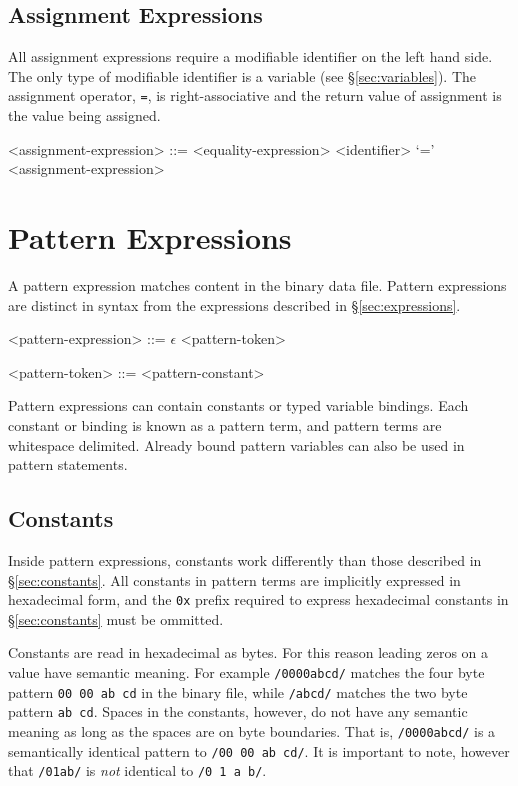 \documentclass[letterpaper]{article}
\begin{document}

\subsection{Assignment Expressions}
\label{sec:assignment}
All assignment expressions require a modifiable identifier on the left hand side.  The only type of modifiable identifier is a variable (see \S\ref{sec:variables}).  The assignment operator, \texttt{=}, is right-associative and the return value of assignment is the value being assigned.
\begin{grammar}
<assignment-expression> ::= <equality-expression>
\alt <identifier> `=' <assignment-expression>
\end{grammar}


\section{Pattern Expressions}
\label{sec:pattern-expressions}
A pattern expression matches content in the binary data file.  Pattern expressions are distinct in syntax from the expressions described in \S\ref{sec:expressions}.

\begin{grammar}
<pattern-expression> ::= $\epsilon$
 <pattern-token>

<pattern-token> ::= <pattern-constant>
\end{grammar}

Pattern expressions can contain constants or typed variable bindings.  Each constant or binding is known as a pattern term, and pattern terms are whitespace delimited.  Already bound pattern variables can also be used in pattern statements.

\subsection{Constants}
\label{sec:pattern-constants}
Inside pattern expressions, constants work differently than those described in \S\ref{sec:constants}.  All constants in pattern terms are implicitly expressed in hexadecimal form, and the \texttt{0x} prefix required to express hexadecimal constants in \S\ref{sec:constants} must be ommitted.

Constants are read in hexadecimal as bytes.  For this reason leading zeros on a value have semantic meaning.  For example \texttt{/0000abcd/} matches the four byte pattern \texttt{00 00 ab cd} in the binary file, while \texttt{/abcd/} matches the two byte pattern \texttt{ab cd}.  Spaces in the constants, however, do not have any semantic meaning as long as the spaces are on byte boundaries.  That is, \texttt{/0000abcd/} is a semantically identical pattern to \texttt{/00 00 ab cd/}.  It is important to note, however that \texttt{/01ab/} is \emph{not} identical to \texttt{/0 1 a b/}.
\end{document}
